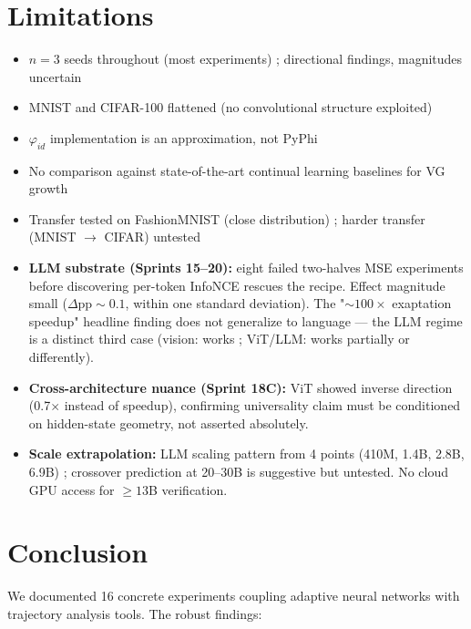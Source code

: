 \documentclass[11pt]{article}
\begin{document}
\section{Limitations}

\begin{itemize}
    \item $n=3$ seeds throughout (most experiments) ; directional findings, magnitudes uncertain
    \item MNIST and CIFAR-100 flattened (no convolutional structure exploited)
    \item $\varphi_{id}$ implementation is an approximation, not PyPhi
    \item No comparison against state-of-the-art continual learning baselines for VG growth
    \item Transfer tested on FashionMNIST (close distribution) ; harder transfer (MNIST $\to$ CIFAR) untested
    \item \textbf{LLM substrate (Sprints 15--20):} eight failed two-halves MSE experiments before discovering per-token InfoNCE rescues the recipe. Effect magnitude small ($\Delta\text{pp} \sim 0.1$, within one standard deviation). The "$\sim 100\times$ exaptation speedup" headline finding does not generalize to language --- the LLM regime is a distinct third case (vision: works ; ViT/LLM: works partially or differently).
    \item \textbf{Cross-architecture nuance (Sprint 18C):} ViT showed inverse direction (0.7$\times$ instead of speedup), confirming universality claim must be conditioned on hidden-state geometry, not asserted absolutely.
    \item \textbf{Scale extrapolation:} LLM scaling pattern from 4 points (410M, 1.4B, 2.8B, 6.9B) ; crossover prediction at 20--30B is suggestive but untested. No cloud GPU access for $\geq 13$B verification.
\end{itemize}

\section{Conclusion}

We documented 16 concrete experiments coupling adaptive neural networks with trajectory analysis tools. The robust findings:
\end{document}
